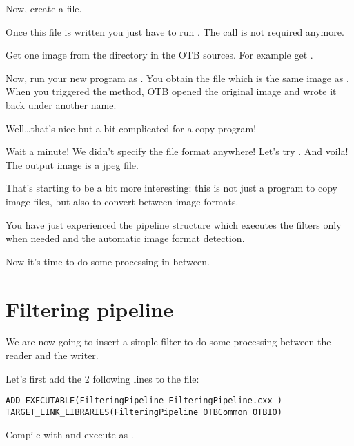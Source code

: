 Now, create a  file.



Once this file is written you just have to run . The
 call is not required anymore.

Get one image from the  directory in the OTB sources.
For example get . 

Now, run your new program as . You
obtain the file  which is the same image as
. When you triggered the  method, OTB opened
the original image and wrote it back under another name. 

Well\ldots that's nice but a bit complicated for a copy program!

Wait a minute! We didn't specify the file format anywhere! Let's try
. And voila! The output image is a jpeg
file. 

That's starting to be a bit more interesting: this is not just a program to copy
image files, but also to convert between image formats.

You have just experienced the pipeline structure which executes the
filters only when needed and the automatic image format detection.

Now it's time to do some processing in between.


\section{Filtering pipeline}
\label{sec:TutorialFiltering}


We are now going to insert a simple filter to do some processing between the
reader and the writer.

Let's first add the 2 following lines to the  file:

\begin{small}
\begin{verbatim}
ADD_EXECUTABLE(FilteringPipeline FilteringPipeline.cxx )
TARGET_LINK_LIBRARIES(FilteringPipeline OTBCommon OTBIO)
\end{verbatim}
\end{small}



Compile with  and execute as .
 
